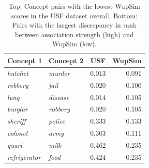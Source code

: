 \begin{table}[t]\begin{center}\begin{tabular}{l|l|r|r}
Concept 1 & Concept 2 & USF & WupSim \\
\hline \emph{hatchet} & \emph{murder} & 0.013 & 0.091 \\
\emph{robbery} & \emph{jail} & 0.020 & 0.100 \\
\emph{lung} & \emph{disease} & 0.014 & 0.105 \\
\emph{burglar} & \emph{robbery}& 0.020 & 0.105\\
\hdashline \emph{sheriff} & \emph{police} & 0.333 & 0.133 \\
\emph{colonel} & \emph{army} & 0.303 & 0.111 \\
\emph{quart}& \emph{milk} & 0.462 & 0.235 \\
\emph{refrigerator} & \emph{food} & 0.424 & 0.235\\
\end{tabular}\end{center}\caption{\label{tab1} Top: Concept pairs with the lowest WupSim scores in the USF dataset overall. Bottom: Pairs with the largest discrepancy in rank between association strength (high) and WupSim (low).}\end{table}



